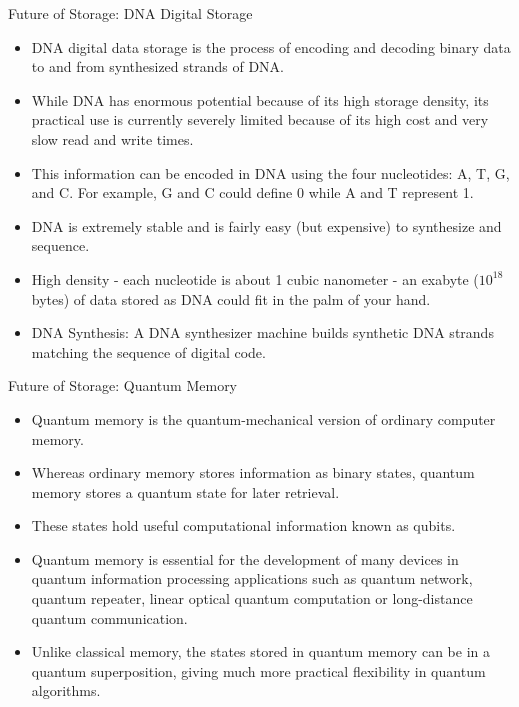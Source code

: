 \documentclass[aspectratio=169, xcolor=dvipsnames]{beamer}
\begin{document}
\begin{frame}{Future of Storage: DNA Digital Storage}
    \begin{block}{}
        \begin{itemize}
            \item DNA digital data storage is the process of encoding and decoding binary data to and from synthesized strands of DNA.
            \item While DNA has enormous potential because of its high storage density, its practical use is currently severely limited because of its high cost and very slow read and write times.
            \item This information can be encoded in DNA using the four nucleotides: A, T, G, and C. For example, G and C could define 0 while A and T represent 1.
            \item DNA is extremely stable and is fairly easy (but expensive) to synthesize and sequence.
            \item High density - each nucleotide is about 1 cubic nanometer - an exabyte ($10^{18}$ bytes) of data stored as DNA could fit in the palm of your hand.
            \item DNA Synthesis: A DNA synthesizer machine builds synthetic DNA strands matching the sequence of digital code.
        \end{itemize}
    \end{block}
\end{frame}

\begin{frame}{Future of Storage: Quantum Memory}
    \begin{block}{}
        \begin{itemize}
            \item Quantum memory is the quantum-mechanical version of ordinary computer memory.
            \item Whereas ordinary memory stores information as binary states, quantum memory stores a quantum state for later retrieval.
            \item These states hold useful computational information known as qubits.
            \item Quantum memory is essential for the development of many devices in quantum information processing applications such as quantum network, quantum repeater, linear optical quantum computation or long-distance quantum communication.
            \item Unlike classical memory, the states stored in quantum memory can be in a quantum superposition, giving much more practical flexibility in quantum algorithms.
        \end{itemize}
    \end{block}
\end{frame}
\end{document}

